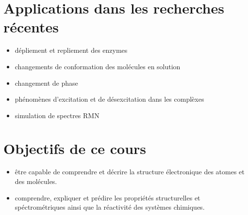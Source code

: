 \documentclass[../main.tex]{subfile}
\begin{document}
\section{Applications dans les recherches récentes}
\begin{itemize}
	\item dépliement et repliement des enzymes
	\item changements de conformation des molécules en solution
	\item changement de phase
	\item phénomènes d'excitation et de désexcitation dans les complèxes
	\item simulation de spectres RMN 
\end{itemize}

\section{Objectifs de ce cours}
\begin{itemize}
	\item être capable de comprendre et décrire la structure électronique des atomes et des molécules.
	\item comprendre, expliquer et prédire les propriétés structurelles et spéctrométriques ainsi que la réactivité des systèmes chimiques.
\end{itemize}
\end{document}
